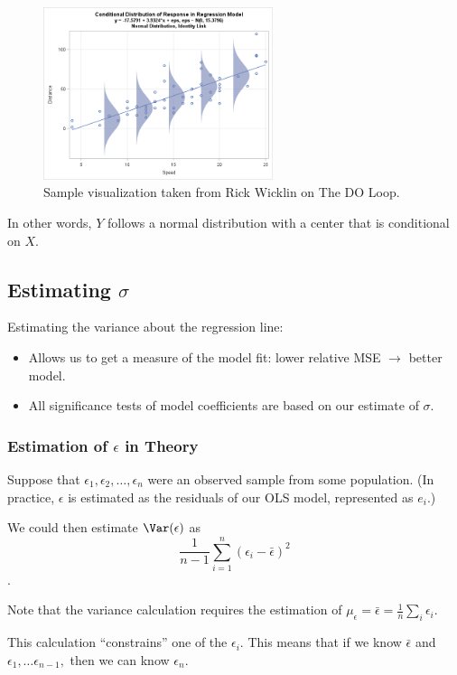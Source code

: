 \documentclass[12pt]{../notes}
\begin{document}
\begin{figure}[H]
\centering
\includegraphics[width = 0.6\textwidth]{../figures/module2/normalPic_wicklin.png}
\caption{Sample visualization taken from Rick Wicklin on The DO Loop.}
\label{wicklin}
\end{figure}

In other words, $Y$ follows a normal distribution with a center that is conditional on $X$. 

\subsection*{Estimating $\sigma$}
Estimating the variance about the regression line:
\begin{itemize}
\item Allows us to get a measure of the model fit: lower relative MSE $\rightarrow$ better model. 
\item All significance tests of model coefficients are based on our estimate of $\sigma$. 
\end{itemize} 

\subsubsection*{Estimation of $\epsilon$ in Theory}
Suppose that $\epsilon_1, \epsilon_2, \ldots, \epsilon_n$ were an observed sample from some population. (In practice, $\epsilon$ is estimated as the residuals of our OLS model, represented as $e_i$.)

\nspace
We could then estimate $\Var(\epsilon)$ as 
\[\frac{1}{n-1}\sum_{i=1}^n\left(\epsilon_i - \bar{\epsilon}\right)^2\].

\nspace
Note that the variance calculation requires the estimation of $\mu_\epsilon = \bar{\epsilon} = \frac{1}{n}\sum_i\epsilon_i.$

\nspace
This calculation ``constrains'' one of the $\epsilon_i$. This means that if we know $\bar{\epsilon}$ and $\epsilon_1, \ldots \epsilon_{n-1},$ then we can know $\epsilon_n$. 
\end{document}
